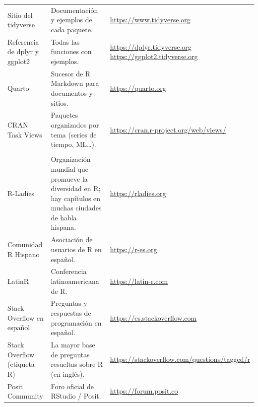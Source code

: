 \begin{longtable}{@{}>{\raggedright\arraybackslash}p{5.0cm}
                    >{\raggedright\arraybackslash}p{5.3cm}
                    >{\raggedright\arraybackslash}p{5.5cm}@{}}
Sitio del tidyverse & Documentación y ejemplos de cada paquete. & \url{https://www.tidyverse.org} \\
Referencia de dplyr y ggplot2 & Todas las funciones con ejemplos. & \url{https://dplyr.tidyverse.org} \newline \url{https://ggplot2.tidyverse.org} \\
Quarto & Sucesor de R Markdown para documentos y sitios. & \url{https://quarto.org} \\
CRAN Task Views & Paquetes organizados por tema (series de tiempo, ML\ldots). & \url{https://cran.r-project.org/web/views/} \\
\midrule
\multicolumn{3}{@{}l}{\textbf{\color{secundario}Comunidades}} \\
R-Ladies & Organización mundial que promueve la diversidad en R; hay capítulos en muchas ciudades de habla hispana. & \url{https://rladies.org} \\
Comunidad R Hispano & Asociación de usuarios de R en español. & \url{https://r-es.org} \\
LatinR & Conferencia latinoamericana de R. & \url{https://latin-r.com} \\
Stack Overflow en español & Preguntas y respuestas de programación en español. & \url{https://es.stackoverflow.com} \\
Stack Overflow (etiqueta R) & La mayor base de preguntas resueltas sobre R (en inglés). & \url{https://stackoverflow.com/questions/tagged/r} \\
Posit Community & Foro oficial de RStudio / Posit. & \url{https://forum.posit.co} \\
\end{longtable}
\endgroup

